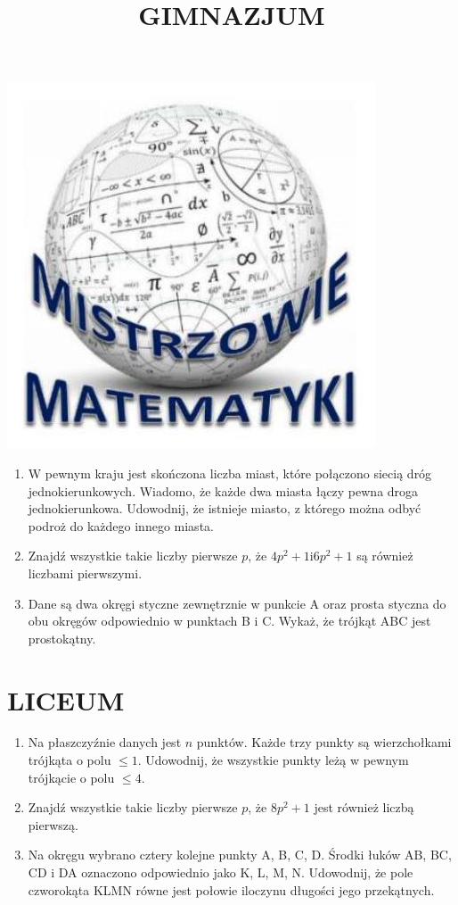 \documentclass[10pt]{article}
\title{GIMNAZJUM }
\author{}
\date{}
\begin{document}
\maketitle
\begin{center}
\includegraphics[max width=\textwidth]{2024_11_21_c9f7c1b601fb91b6b2c7g-1}
\end{center}

\begin{enumerate}
  \item W pewnym kraju jest skończona liczba miast, które połączono siecią dróg jednokierunkowych. Wiadomo, że każde dwa miasta łączy pewna droga jednokierunkowa. Udowodnij, że istnieje miasto, z którego można odbyć podroż do każdego innego miasta.
  \item Znajdź wszystkie takie liczby pierwsze \(p\), że \(4 p^{2}+1 \mathrm{i} 6 p^{2}+1\) są również liczbami pierwszymi.
  \item Dane są dwa okręgi styczne zewnętrznie w punkcie A oraz prosta styczna do obu okręgów odpowiednio w punktach B i C. Wykaż, że trójkąt ABC jest prostokątny.
\end{enumerate}

\section*{LICEUM}
\begin{enumerate}
  \item Na płaszczyźnie danych jest \(n\) punktów. Każde trzy punkty są wierzchołkami trójkąta o polu \(\leq 1\). Udowodnij, że wszystkie punkty leżą w pewnym trójkącie o polu \(\leq 4\).
  \item Znajdź wszystkie takie liczby pierwsze \(p\), że \(8 p^{2}+1\) jest również liczbą pierwszą.
  \item Na okręgu wybrano cztery kolejne punkty A, B, C, D. Środki łuków AB, BC, CD i DA oznaczono odpowiednio jako K, L, M, N. Udowodnij, że pole czworokąta KLMN równe jest połowie iloczynu długości jego przekątnych.
\end{enumerate}
\end{document}
